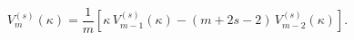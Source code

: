 \begin{equation}
V_{m}^{(s)}(\kappa)=\frac{1}{m}\left[
\kappa\, V_{m-1}^{(s)}(\kappa)-(m+2s-2)\,V_{m-2}^{(s)}(\kappa)
\right].
\label{req1}
\end{equation}


